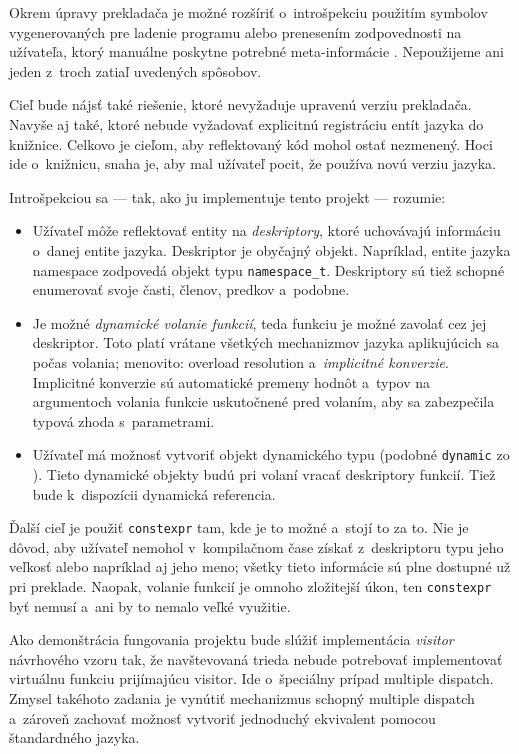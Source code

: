 Okrem úpravy prekladača je možné rozšíriť \Cpp{} o~introšpekciu použitím symbolov vygenerovaných pre ladenie programu alebo prenesením zodpovednosti na užívateľa, ktorý manuálne poskytne potrebné meta-informácie \citep{brautigam}. Nepoužijeme ani jeden z~troch zatiaľ uvedených spôsobov.

Cieľ bude nájsť také riešenie, ktoré nevyžaduje upravenú verziu prekladača. Navyše aj také, ktoré nebude vyžadovať explicitnú registráciu entít jazyka do knižnice. Celkovo je cieľom, aby reflektovaný kód mohol ostať nezmenený. Hoci ide o~knižnicu, snaha je, aby mal užívateľ pocit, že používa novú verziu jazyka.

Introšpekciou sa --- tak, ako ju implementuje tento projekt --- rozumie:
\begin{itemize}
    \item Užívateľ môže reflektovať entity na \emph{deskriptory}, ktoré uchovávajú informáciu o~danej entite jazyka. Deskriptor je obyčajný \Cpp{} objekt. Napríklad, entite jazyka namespace zodpovedá objekt typu \texttt{namespace\_t}. Deskriptory sú tiež schopné enumerovať svoje časti, členov, predkov a~podobne.
    \item Je možné \emph{dynamické volanie funkcií}, teda funkciu je možné zavolať cez jej deskriptor. Toto platí vrátane všetkých mechanizmov jazyka aplikujúcich sa počas volania; menovito: overload resolution a~\emph{implicitné konverzie}. Implicitné konverzie sú automatické premeny hodnôt a~typov na argumentoch volania funkcie uskutočnené pred volaním, aby sa zabezpečila typová zhoda s~parametrami.
    \item Užívateľ má možnosť vytvoriť objekt dynamického typu (podobné \texttt{dynamic} zo \Csharp{}). Tieto dynamické objekty budú pri volaní vracať deskriptory funkcií. Tiež bude k~dispozícii dynamická referencia.
\end{itemize}

Ďalší cieľ je použiť \texttt{constexpr} tam, kde je to možné a~stojí to za to. Nie je dôvod, aby užívateľ nemohol v~kompilačnom čase získať z~deskriptoru typu jeho veľkosť alebo napríklad aj jeho meno; všetky tieto informácie sú plne dostupné už pri preklade. Naopak, volanie funkcií je omnoho zložitejší úkon, ten \texttt{constexpr} byť nemusí a~ani by to nemalo veľké využitie.

Ako demonštrácia fungovania projektu bude slúžiť implementácia \emph{visitor} návrhového vzoru tak, že navštevovaná trieda nebude potrebovať implementovať virtuálnu funkciu prijímajúcu visitor. Ide o~špeciálny prípad multiple dispatch. Zmysel takéhoto zadania je vynútiť mechanizmus schopný multiple dispatch a~zároveň zachovať možnosť vytvoriť jednoduchý ekvivalent pomocou štandardného jazyka.

